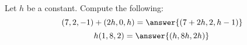 \begin{problem}
Let $h$ be a constant. Compute the following:
\[
(7,2,-1)+(2h,0,h)=\answer{(7+2h,2,h-1)}
\]
\[
h(1,8,2)=\answer{(h,8h,2h)}
\]
\end{problem}